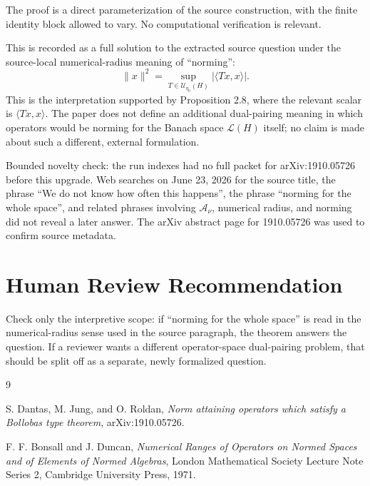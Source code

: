 \documentclass[11pt]{article}
\newcommand{\Anu}{\mathcal A_{\nu}}
\newcommand{\Lcal}{\mathcal L}
\begin{document}
The proof is a direct parameterization of the source construction, with the finite identity block allowed to vary. No computational verification is relevant.

This is recorded as a full solution to the extracted source question under the
source-local numerical-radius meaning of ``norming'':
\[
\|x\|^2=\sup_{T\in\mathscr U_{\eta_0}(H)}|\langle Tx,x\rangle|.
\]
This is the interpretation supported by Proposition 2.8, where the relevant
scalar is \(\langle Tx,x\rangle\).  The paper does not define an additional
dual-pairing meaning in which operators would be norming for the Banach space
\(\Lcal(H)\) itself; no claim is made about such a different, external
formulation.

Bounded novelty check: the run indexes had no full packet for arXiv:1910.05726
before this upgrade.  Web searches on June 23, 2026 for the source title, the
phrase ``We do not know how often this happens'', the phrase ``norming for the
whole space'', and related phrases involving \(\Anu\), numerical radius, and
norming did not reveal a later answer. The arXiv abstract page for 1910.05726
was used to confirm source metadata.

\section*{Human Review Recommendation}

Check only the interpretive scope: if ``norming for the whole space'' is read
in the numerical-radius sense used in the source paragraph, the theorem answers
the question.  If a reviewer wants a different operator-space dual-pairing
problem, that should be split off as a separate, newly formalized question.

\begin{thebibliography}{9}

S. Dantas, M. Jung, and O. Roldan,
\emph{Norm attaining operators which satisfy a Bollobas type theorem},
arXiv:1910.05726.

F. F. Bonsall and J. Duncan,
\emph{Numerical Ranges of Operators on Normed Spaces and of Elements of Normed Algebras},
London Mathematical Society Lecture Note Series 2, Cambridge University Press, 1971.

\end{thebibliography}
\end{document}
